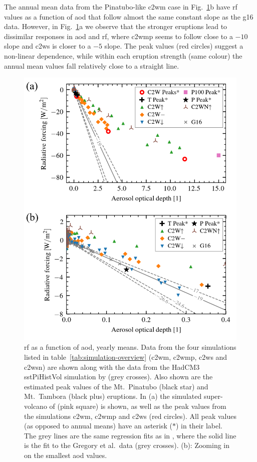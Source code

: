 \documentclass{ametsocV6.1}
\begin{document}
The annual mean data from the Pinatubo-like \gls{c2wm} case in
Fig.~\ref{fig:aod_vs_toa_ses_avg}b have \gls{rf} values as a function of \gls{aod} that
follow almost the same constant slope as the \gls{g16} data. However, in
Fig.~\ref{fig:aod_vs_toa_ses_avg}a we observe that the stronger eruptions lead to
dissimilar responses in \gls{aod} and \gls{rf}, where \gls{c2wmp}
seems to follow close to a \(-10\) slope and \gls{c2ws} is closer to a
\(-5\) slope. The peak values (red circles) suggest a non-linear dependence, while
within each eruption strength (same colour) the annual mean values fall relatively close
to a straight line.

\begin{figure}
  \centering
  \includegraphics{figures/figure2.png}

  \caption{\gls{rf} as a function of \gls{aod}, yearly means. Data from the four
    simulations listed in table~\ref{tab:simulation-overview} (\gls{c2wm}, \gls{c2wmp},
    \gls{c2ws} and \gls{c2wsn}) are shown along with the data from the HadCM3 sstPiHistVol
    simulation by \citet{gregory2016} (grey crosses). Also shown are the estimated peak
    values of the Mt.\ Pinatubo (black star) and Mt.\ Tambora (black plus) eruptions. In (a)
    the simulated super-volcano of \citet{jones2005} (pink square) is shown, as well as the
    peak values from the simulations \gls{c2wm}, \gls{c2wmp} and \gls{c2ws} (red circles).
    All peak values (as opposed to annual means) have an asterisk (\(\ast{}\)) in their
    label. The grey lines are the same regression fits as in \citet[][Fig.\ 4]{gregory2016},
    where the solid line is the fit to the Gregory et al.\ data (grey crosses). (b): Zooming
    in on the smallest \gls{aod} values.}\label{fig:aod_vs_toa_ses_avg}%
\end{figure}
\end{document}
